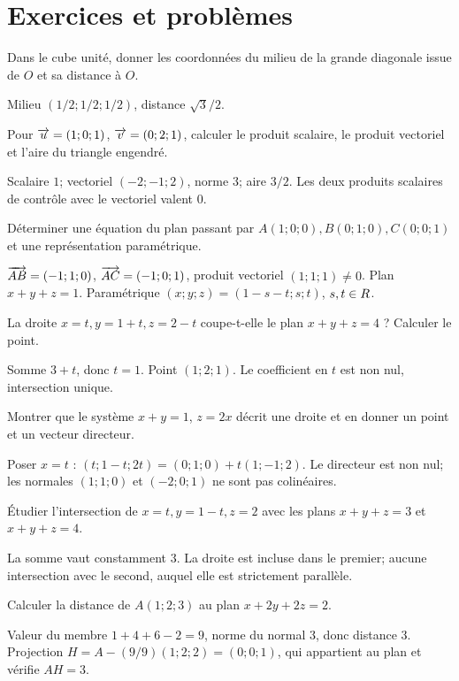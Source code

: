 \section{Exercices et problèmes}
\exo[Cube]\label{t11s-c17-e01}
Dans le cube unité, donner les coordonnées du milieu de la grande diagonale issue de $O$ et sa distance à $O$.
\begin{corrige}\label{sol-t11s-c17-e01}
Milieu $(1/2;1/2;1/2)$, distance $\sqrt3/2$.
\end{corrige}
\exo[Produits]\label{t11s-c17-e02}
Pour $\overrightarrow{u}=(1;0;1)$, $\overrightarrow{v}=(0;2;1)$, calculer le produit scalaire, le produit vectoriel et l’aire du triangle engendré.
\begin{corrige}\label{sol-t11s-c17-e02}
Scalaire $1$; vectoriel $(-2;-1;2)$, norme $3$; aire $3/2$. Les deux produits scalaires de contrôle avec le vectoriel valent $0$.
\end{corrige}
\label{t11s-c17-e03}
Déterminer une équation du plan passant par $A(1;0;0),B(0;1;0),C(0;0;1)$ et une représentation paramétrique.
\begin{corrige}\label{sol-t11s-c17-e03}
$\overrightarrow{AB}=(-1;1;0)$, $\overrightarrow{AC}=(-1;0;1)$, produit vectoriel $(1;1;1)\ne0$. Plan $x+y+z=1$. Paramétrique $(x;y;z)=(1-s-t;s;t)$, $s,t\in R$.
\end{corrige}
\exo[Intersection]\label{t11s-c17-e04}
La droite $x=t,y=1+t,z=2-t$ coupe-t-elle le plan $x+y+z=4$ ? Calculer le point.
\begin{corrige}\label{sol-t11s-c17-e04}
Somme $3+t$, donc $t=1$. Point $(1;2;1)$. Le coefficient en $t$ est non nul, intersection unique.
\end{corrige}
\label{t11s-c17-e05}
Montrer que le système $x+y=1$, $z=2x$ décrit une droite et en donner un point et un vecteur directeur.
\begin{corrige}\label{sol-t11s-c17-e05}
Poser $x=t$ : $(t;1-t;2t)=(0;1;0)+t(1;-1;2)$. Le directeur est non nul; les normales $(1;1;0)$ et $(-2;0;1)$ ne sont pas colinéaires.
\end{corrige}
\label{t11s-c17-e06}
Étudier l’intersection de $x=t,y=1-t,z=2$ avec les plans $x+y+z=3$ et $x+y+z=4$.
\begin{corrige}\label{sol-t11s-c17-e06}
La somme vaut constamment $3$. La droite est incluse dans le premier; aucune intersection avec le second, auquel elle est strictement parallèle.
\end{corrige}
\exo[Distance]\label{t11s-c17-e07}
Calculer la distance de $A(1;2;3)$ au plan $x+2y+2z=2$.
\begin{corrige}\label{sol-t11s-c17-e07}
Valeur du membre $1+4+6-2=9$, norme du normal $3$, donc distance $3$. Projection $H=A-(9/9)(1;2;2)=(0;0;1)$, qui appartient au plan et vérifie $AH=3$.
\end{corrige}

